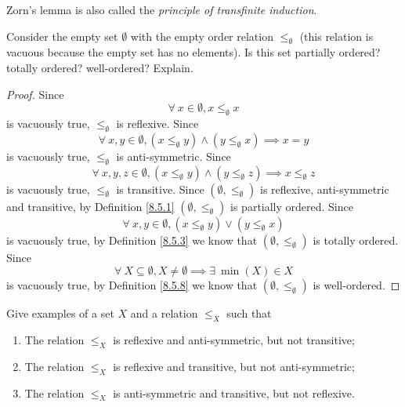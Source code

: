 \begin{note}
    Zorn's lemma is also called the \emph{principle of transfinite induction}.
\end{note}

\exercisesection

\begin{exercise}\label{ex 8.5.1}
    Consider the empty set \(\emptyset\) with the empty order relation \(\leq_\emptyset\)
    (this relation is vacuous because the empty set has no elements).
    Is this set partially ordered? totally ordered? well-ordered? Explain.
\end{exercise}

\begin{proof}
    Since
    \[
        \forall\ x \in \emptyset, x \leq_{\emptyset} x
    \]
    is vacuously true, \(\leq_{\emptyset}\) is reflexive.
    Since
    \[
        \forall\ x, y \in \emptyset, (x \leq_{\emptyset} y) \land (y \leq_{\emptyset} x) \implies x = y
    \]
    is vacuously true, \(\leq_{\emptyset}\) is anti-symmetric.
    Since
    \[
        \forall\ x, y, z \in \emptyset, (x \leq_{\emptyset} y) \land (y \leq_{\emptyset} z) \implies x \leq_{\emptyset} z
    \]
    is vacuously true, \(\leq_{\emptyset}\) is transitive.
    Since \((\emptyset, \leq_{\emptyset})\) is reflexive, anti-symmetric and transitive, by Definition \ref{8.5.1} \((\emptyset, \leq_{\emptyset})\) is partially ordered.
    Since
    \[
        \forall\ x, y \in \emptyset, (x \leq_{\emptyset} y) \lor (y \leq_{\emptyset} x)
    \]
    is vacuously true, by Definition \ref{8.5.3} we know that \((\emptyset, \leq_{\emptyset})\) is totally ordered.
    Since
    \[
        \forall\ X \subseteq \emptyset, X \neq \emptyset \implies \exists\ \min(X) \in X
    \]
    is vacuously true, by Definition \ref{8.5.8} we know that \((\emptyset, \leq_{\emptyset})\) is well-ordered.
\end{proof}

\begin{exercise}\label{ex 8.5.2}
    Give examples of a set \(X\) and a relation \(\leq_X\) such that
    \begin{enumerate}
        \item The relation \(\leq_X\) is reflexive and anti-symmetric, but not transitive;
        \item The relation \(\leq_X\) is reflexive and transitive, but not anti-symmetric;
        \item The relation \(\leq_X\) is anti-symmetric and transitive, but not reflexive.
    \end{enumerate}
\end{exercise}

